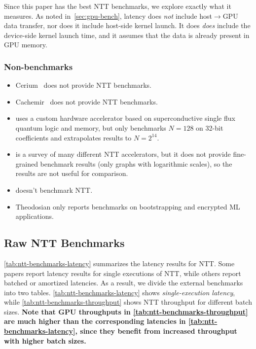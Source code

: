 \documentclass{article}
\begin{document}
	Since this paper has the best NTT benchmarks, we explore exactly what it measures. As noted in~\cref{sec:gpu-bench}, latency does \emph{not} include host$\rightarrow$GPU data transfer, nor does it include host-side kernel launch. It does \emph{does} include the device-side kernel launch time, and it assumes that the data is already present in GPU memory. 
	
	\subsubsection{Non-benchmarks}
	\begin{itemize}
		\item Cerium~\cite{jayashankar2025scalablemultigpuframeworkencrypted} does not provide NTT benchmarks.
		
		\item Cachemir~\cite{cachemir} does not provide NTT benchmarks.
		
		\item \cite{razmkhah2025scentthardwareacceleratornumber} uses a custom hardware accelerator based on superconductive single flux quantum logic and memory, but only benchmarks $N=128$ on 32-bit coefficients and extrapolates results to $N=2^{14}$.
		
		\item \cite{Zhang_2024} is a survey of many different NTT accelerators, but it does not provide fine-grained benchmark results (only graphs with logarithmic scales), so the results are not useful for comparison.
		
		\item \cite{li2025catgpuacceleratedfheframework} doesn't benchmark NTT.
		
		\item Theodosian \cite{choi2025theodosiandeepdivememoryhierarchycentric} only reports benchmarks on bootstrapping and encrypted ML applications.
	\end{itemize}	
	
	\subsection{Raw NTT Benchmarks}
	\cref{tab:ntt-benchmarks-latency} summarizes the latency results for NTT. Some papers report latency results for single executions of NTT, while others report batched or amortized latencies. As a result, we divide the external benchmarks into two tables. \cref{tab:ntt-benchmarks-latency} shows \emph{single-execution latency}, while \cref{tab:ntt-benchmarks-throughput} shows NTT throughput for different batch sizes. \textbf{Note that GPU throughputs in \cref{tab:ntt-benchmarks-throughput} are much higher than the corresponding latencies in \cref{tab:ntt-benchmarks-latency}, since they benefit from increased throughput with higher batch sizes.}
	
\end{document}
